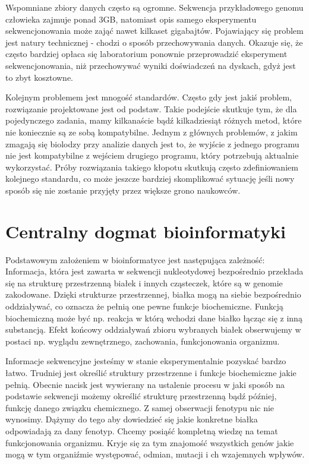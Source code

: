 Wspomniane zbiory danych często są ogromne. Sekwencja przykładowego genomu człowieka zajmuje ponad 3GB, natomiast opis samego eksperymentu sekwencjonowania może zająć nawet kilkaset gigabajtów. Pojawiający się problem jest natury technicznej - chodzi o sposób przechowywania danych. Okazuje się, że często bardziej opłaca się laboratorium ponownie przeprowadzić eksperyment sekwencjonowania, niż przechowywać wyniki doświadczeń na dyskach, gdyż jest to zbyt kosztowne. 

Kolejnym problemem jest mnogość standardów. Często gdy jest jakiś problem, rozwiązanie projektowane jest od podstaw. Takie podejście skutkuje tym, że dla pojedynczego zadania, mamy kilkanaście bądź kilkadziesiąt różnych metod, które nie koniecznie są ze sobą kompatybilne. Jednym z głównych problemów, z jakim zmagają się biolodzy przy analizie danych jest to, że wyjście z jednego programu nie jest kompatybilne z wejściem drugiego programu, który potrzebują aktualnie wykorzystać. Próby rozwiązania takiego kłopotu skutkują często zdefiniowaniem kolejnego standardu, co może jeszcze bardziej skomplikować sytuację jeśli nowy sposób się nie zostanie przyjęty przez większe grono naukowców.



\section{Centralny dogmat bioinformatyki}
Podstawowym założeniem w bioinformatyce jest następująca zależność:
Informacja, która jest zawarta w sekwencji nukleotydowej bezpośrednio przekłada się na strukturę przestrzenną białek i innych cząsteczek, które są w genomie zakodowane. Dzięki strukturze przestrzennej, białka mogą na siebie bezpośrednio oddziaływać, co oznacza że pełnią one pewne funkcje biochemiczne. Funkcją biochemiczną może być np. reakcja w którą wchodzi dane białko łącząc się z inną substancją. Efekt końcowy oddziaływań zbioru wybranych białek obserwujemy w postaci np. wyglądu zewnętrznego, zachowania, funkcjonowania organizmu.

Informacje sekwencyjne jesteśmy w stanie eksperymentalnie pozyskać bardzo łatwo. Trudniej jest określić struktury przestrzenne i funkcje biochemiczne jakie pełnią.
Obecnie nacisk jest wywierany na ustalenie procesu w jaki sposób na podstawie sekwencji możemy określić strukturę przestrzenną bądź później, funkcję danego związku chemicznego.
Z samej obserwacji fenotypu nic nie wynosimy. Dążymy do tego aby dowiedzieć się jakie konkretne białka odpowiadają za dany fenotyp. Chcemy posiąść kompletną wiedzę na temat funkcjonowania organizmu. Kryje się za tym znajomość wszystkich genów jakie mogą w tym organiźmie występować, odmian, mutacji i ch wzajemnych wpływów.

